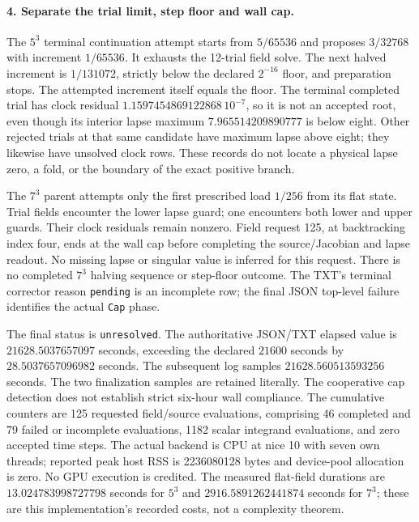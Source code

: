 \documentclass[11pt]{article}
\begin{document}
\paragraph{4. Separate the trial limit, step floor and wall cap.}
The $5^3$ terminal continuation attempt starts from $5/65536$
and proposes $3/32768$ with increment $1/65536$.
It exhausts the 12-trial field solve.  The next halved
increment is $1/131072$, strictly below the declared
$2^{-16}$ floor, and preparation stops.
The attempted increment itself equals the floor.
The terminal completed trial has clock residual
$1.1597454869122868\,10^{-7}$, so it is not an accepted root,
even though its interior lapse maximum
$7.965514209890777$ is below eight.
Other rejected trials at that same candidate have maximum
lapse above eight; they likewise have unsolved clock rows.
These records do not locate a physical lapse zero, a fold,
or the boundary of the exact positive branch.

The $7^3$ parent attempts only the first prescribed load
$1/256$ from its flat state.
Trial fields encounter the lower lapse guard; one encounters
both lower and upper guards.  Their clock residuals remain
nonzero.  Field request 125, at backtracking index four,
ends at the wall cap before completing the source/Jacobian
and lapse readout.  No missing lapse or singular value is
inferred for this request.  There is no completed $7^3$
halving sequence or step-floor outcome.
The TXT's terminal corrector reason \texttt{pending} is an
incomplete row; the final JSON top-level failure identifies
the actual \texttt{Cap} phase.

The final status is \texttt{unresolved}.
The authoritative JSON/TXT elapsed value is
$21628.5037657097$ seconds, exceeding the declared
$21600$ seconds by $28.5037657096982$ seconds.
The subsequent log samples $21628.560513593256$ seconds.
The two finalization samples are retained literally.
The cooperative cap detection does not establish strict
six-hour wall compliance.
The cumulative counters are 125 requested field/source
evaluations, comprising 46 completed and 79 failed or
incomplete evaluations, 1182 scalar integrand evaluations,
and zero accepted time steps.
The actual backend is CPU at nice 10 with seven own threads;
reported peak host RSS is 2236080128 bytes and device-pool
allocation is zero.  No GPU execution is credited.
The measured flat-field durations are
$13.024783998727798$ seconds for $5^3$ and
$2916.5891262441874$ seconds for $7^3$; these are this
implementation's recorded costs, not a complexity theorem.
\end{document}
